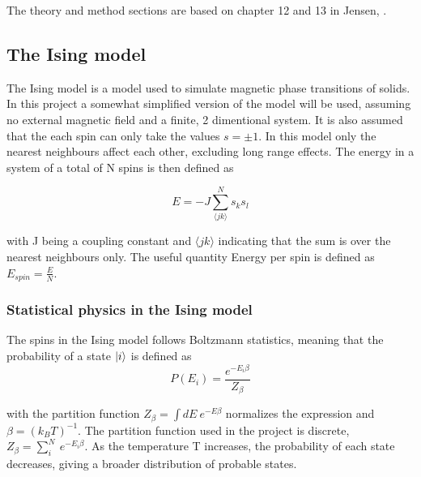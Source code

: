 
The theory and method sections are based on chapter 12 and 13 in Jensen, \cite{Jensen}.
\subsection{The Ising model}

The Ising model is a model used to simulate magnetic phase transitions of solids. In this project a somewhat simplified version of the model will be used, assuming no external magnetic field and a finite, 2 dimentional system. It is also assumed that the each spin can only take the values $ s  = \pm 1$.  In this model only the nearest neighbours affect each other, excluding long range effects. The energy in a system of a total of N spins is then defined as

\begin{equation}\label{eq: Energy_Ising}
E = -J \sum\limits_{\langle jk \rangle }^{N} s_ks_l
\end{equation}

with J being a coupling constant and  $ \langle jk \rangle $ indicating that the sum is over the nearest neighbours only. The useful quantity Energy per spin is defined as $ E_{spin}  = \frac{E}{N}$. 


\subsubsection{Statistical physics in the Ising model}

The spins in the Ising model follows Boltzmann statistics, meaning that the probability of a state $\ket{i}$ is defined as 
\begin{equation}\label{eq:boltzmann}
P(E_i) = \frac{e^{-E_i\beta}}{Z_{\beta}} 
\end{equation}

with the partition function $ Z_{\beta} = \int dE \ e^{-E\beta} $ normalizes the expression and $ \beta = (k_BT)^{-1} $. The partition function used in the project is discrete,$ Z_{\beta} = \sum\limits_{i}^{N} \ e^{-E_i\beta} $. As the temperature T increases, the probability of each state decreases, giving a broader distribution of probable states.  

